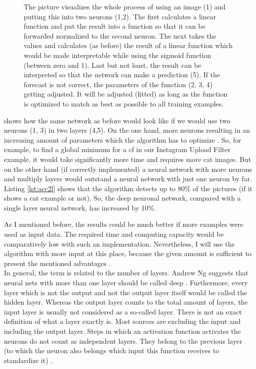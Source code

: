 \begin{figure}[htp]
	\centering
	\caption{The picture visualizes the whole process of using an image (1) and putting this into two neurons (1,2). The first calculates a linear function and put the result into a  function so that it can be forwarded normalized to the second neuron. The next takes the values and calculates (as before) the result of a linear function which would be made interpretable while using the sigmoid function (between zero and 1). Last but not least, the result can be interpreted so that the network can make a prediction (5). If the forecast is not correct, the parameters of the function (2, 3, 4) getting adjusted. It will be adjusted (fitted) as long as the function is optimized to match as best as possible to all training examples.}
	\label{fig:10_process_of_pretictions_for_a_cat_image_two_layers}
\end{figure}

shows how the same network as before would look like if we would use two neurons  (1, 3) in two layers (4,5). On the one hand, more neurons resulting in an increasing amount of parameters which the algorithm has to optimize \cite[p. 21]{Goodfellow-et-al-2016}. So, for example, to find a global minimum for a \Gls{cf} in our Instagram Upload Filter example, it would take significantly more time and requires more cat images. But on the other hand (if correctly implemented) a neural network with more neurons and multiply layers would outstand a neural network with just one neuron by far. Listing \ref{lst:acc2l} shows that the algorithm detects up to 80\% of the pictures (if it shows a cat example or not). So, the deep neuronal network, compared with a single layer neural network, has increased by 10\%.

As I mentioned before, the results could be much better if more examples were used as input data. The required time and computing capacity would be comparatively low with such an implementation. Nevertheless, I will use the algorithm with more input at this place, because the given amount is sufficient to present the mentioned advantages \cite[p.167]{Goodfellow-et-al-2016} \cite[p.995 - 997]{Murphy2012}.\\

In general, the term is related to the number of layers. Andrew Ng suggests that neural nets with more than one layer should be called deep \cite{AndrewNG}. Furthermore, every layer which is not the output and not the output layer itself would be called the hidden layer. Whereas the output layer counts to the total amount of layers, the input layer is usually not considered as a so-called layer. There is not an exact definition of what a layer exactly is. Most sources are excluding the input and including the output layer. Steps in which an activation function activates the neurons do not count as independent layers. They belong to the previous layer (to which the neuron also belongs which input this function receives to standardize it)\cite{AndrewNG} \cite{Kriesel2007NeuralNetworks} \cite{Goodfellow-et-al-2016}.\\

